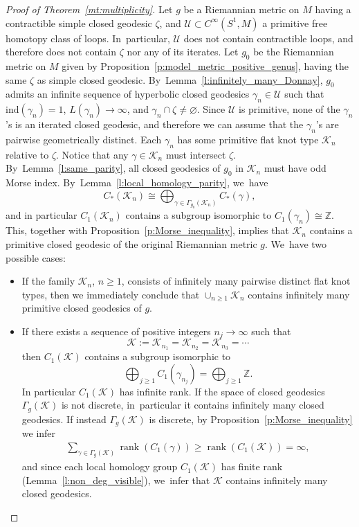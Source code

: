 \documentclass[JEP,XML,SOM,Unicode,NoFloatCountersInSection,published]{cedram}
\newcommand{\Z}{\mathbb{Z}}
\newcommand{\KK}{\mathcal{K}}
\newcommand{\UU}{\mathcal{U}}
\newcommand{\ind}{\mathrm{ind}}
\DeclareMathOperator{\rank}{rank}
\theoremstyle{plain}
\theoremstyle{definition}
\begin{document}
\begin{proof}[Proof of Theorem~\ref{mt:multiplicity}]
Let $g$ be a Riemannian metric on $M$ having a contractible simple closed geodesic $\zeta$, and $\UU\subset C^\infty(S^1,M)$ a primitive free homotopy class of loops. In~particular, $\UU$ does not contain contractible loops, and therefore does not contain $\zeta$ nor any of its iterates.
Let $g_0$ be the Riemannian metric on $M$ given by Proposition~\ref{p:model_metric_positive_genus}, having the same $\zeta$ as simple closed geodesic. By~Lemma~\ref{l:infinitely_many_Donnay}, $g_0$ admits an infinite sequence of hyperbolic closed geodesics $\gamma_n\in\UU$ such that $\ind(\gamma_n)=1$, $L(\gamma_n)\to\infty$, and $\gamma_n\cap\zeta\neq\varnothing$. Since $\UU$ is primitive, none of the $\gamma_n$'s is an iterated closed geodesic, and therefore we can assume that the $\gamma_n$'s are pairwise geometrically distinct. Each $\gamma_n$ has some primitive flat knot type $\KK_n$ relative to $\zeta$. Notice that any $\gamma\in\KK_n$ must intersect $\zeta$. By~Lemma~\ref{l:same_parity}, all closed geodesics of $g_0$ in $\KK_n$ must have odd Morse index. By~Lemma~\ref{l:local_homology_parity}, we~have
\[
C_*(\KK_n) \cong \bigoplus_{\gamma\in\Gamma_{g_0}(\KK_n)} C_*(\gamma),
\]
and in particular $C_1(\KK_n)$ contains a subgroup isomorphic to $C_1(\gamma_n)\cong\Z$. This, together with Proposition~\ref{p:Morse_inequality}, implies that $\KK_n$ contains a primitive closed geodesic of the original Riemannian metric $g$. We~have two possible cases:
\begin{itemize}
\item If the family $\KK_n$, $n\geq1$, consists of infinitely many pairwise distinct flat knot types, then we immediately conclude that $\cup_{n\geq1}\KK_n$ contains infinitely many primitive closed geodesics of $g$.

\item If there exists a sequence of positive integers $n_j\to\infty$ such that
\[
\KK:=\KK_{n_1}=\KK_{n_2}=\KK_{n_3}=\cdots
\]
then $C_1(\KK)$ contains a subgroup isomorphic to
\[
\bigoplus_{j\geq1}C_1(\gamma_{n_j})=\bigoplus_{j\geq1}\Z.
\]
In particular $C_1(\KK)$ has infinite rank.
If the space of closed geodesics $\Gamma_g(\KK)$ is not discrete, in~particular it contains infinitely many closed geodesics. If instead $\Gamma_g(\KK)$ is discrete, by Proposition~\ref{p:Morse_inequality} we infer
\begin{align*}
\sum_{\gamma\in\Gamma_g(\KK)}
\rank(C_1(\gamma))
\geq
\rank(C_1(\KK))
=\infty,
\end{align*}
and since each local homology group $C_1(\KK)$ has finite rank (Lemma~\ref{l:non_deg_visible}), we~infer that $\KK$ contains infinitely many closed geodesics.
\qedhere
\end{itemize}
\end{proof}
\end{document}
